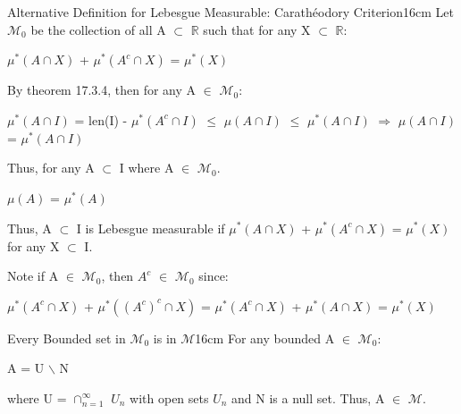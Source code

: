     \begin{definition}{Alternative Definition for Lebesgue Measurable:
    Carathéodory Criterion}{16cm}
        Let $\mathcal{M}_0$ be the collection of all A $\subset$ $\mathbb{R}$
        such that for any X $\subset$ $\mathbb{R}$:

        \hspace{0.5cm}
        $\mu^*(A \cap X)$ + $\mu^*(A^c \cap X)$ = $\mu^*(X)$

        By {\color{red} theorem 17.3.4}, then for any A $\in$ $\mathcal{M}_0$:

        \hspace{0.5cm}
        $\mu^*(A \cap I)$
        = len(I) - $\mu^*(A^c \cap I)$
        $\leq$ $\mu(A \cap I)$
        $\leq$ $\mu^*(A \cap I)$
        \hspace{0.5cm}
        $\Rightarrow$
        \hspace{0.5cm}
        $\mu(A \cap I)$
        = $\mu^*(A \cap I)$

        Thus, for any A $\subset$ I where A $\in$ $\mathcal{M}_0$.

        \hspace{0.5cm}
        $\mu(A)$ = $\mu^*(A)$

        Thus, A $\subset$ I is Lebesgue measurable if
        $\mu^*(A \cap X)$ + $\mu^*(A^c \cap X)$ = $\mu^*(X)$
        for any X $\subset$ I.

        Note if A $\in$ $\mathcal{M}_0$, then $A^c$ $\in$ $\mathcal{M}_0$ since:
        
        \hspace{0.5cm}
        $\mu^*(A^c \cap X)$ + $\mu^*((A^c)^c \cap X)$
        = $\mu^*(A^c \cap X)$ + $\mu^*(A \cap X)$ = $\mu^*(X)$
    \end{definition}

    \newpage



    \begin{wtheorem}{Every Bounded set in $\mathcal{M}_0$ is in $\mathcal{M}$}{16cm}
        For any bounded A $\in$ $\mathcal{M}_0$:

        \hspace{0.5cm}
        A = U $\backslash$ N

        where U = $\cap_{n=1}^{\infty}$ $U_n$ with open sets $U_n$
        and N is a null set.
        Thus, A $\in$ $\mathcal{M}$.
    \end{wtheorem}

